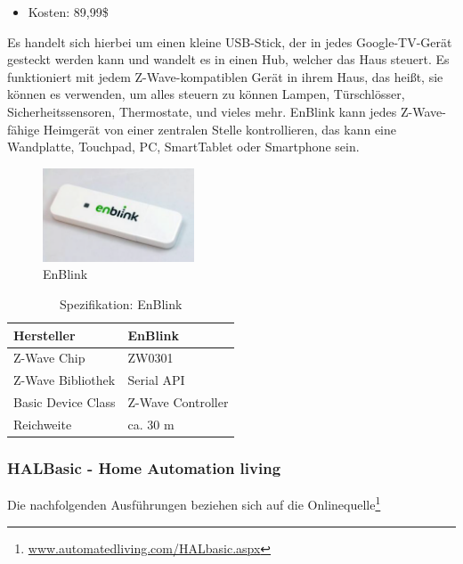 \begin{itemize}
\item Kosten: 89,99\$
\end{itemize}

\noindent
Es handelt sich hierbei um einen kleine USB-Stick, der in jedes Google-TV-Gerät gesteckt werden kann und wandelt es in einen Hub, welcher das Haus steuert. Es funktioniert mit jedem Z-Wave-kompatiblen Gerät in ihrem Haus, das heißt, sie können es verwenden, um alles steuern zu können Lampen, Türschlösser, Sicherheitssensoren, Thermostate, und vieles mehr. EnBlink kann jedes Z-Wave-fähige Heimgerät von einer zentralen Stelle kontrollieren, das kann eine Wandplatte, Touchpad, PC, SmartTablet oder Smartphone sein.

\begin{figure}[h!]
	\centering
	\includegraphics[width=0.4\textwidth]{img/Feedback-Mechanismen/EnBlink.png}
	\caption{EnBlink}
	\label{fig:feedbackEnBlink}
\end{figure}

\begin{table}[H]
	\begin{tabularx}{\textwidth}{
			>{\hsize=0.5\hsize}X 
			>{\hsize=1.5\hsize}X
		}
		\hline
		Hersteller	
		& EnBlink \\
		\hline 
	 	Z-Wave Chip
		& ZW0301 \\
		\hline 
	 	Z-Wave Bibliothek
		& Serial API \\
		\hline 
	 	Basic Device Class
		& Z-Wave Controller \\
		\hline 
	 	Reichweite
		& ca. 30 m \\
		\hline 
	\end{tabularx}
	\caption{Spezifikation: EnBlink}
\end{table}

\subsubsection{HALBasic - Home Automation living}
Die nachfolgenden Ausführungen beziehen sich auf die Onlinequelle\footnote{\url{www.automatedliving.com/HALbasic.aspx}}

